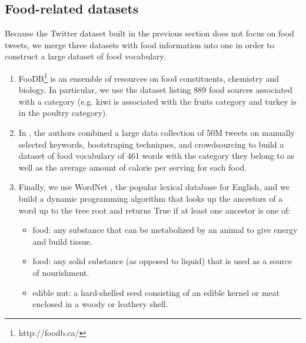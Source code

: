 \documentclass[letterpaper]{article}
\newcommand{\cut}[1]{}
\begin{document}
\subsection{Food-related datasets}

Because the Twitter dataset built in the previous section does not focus on food tweets, we merge three datasets with food information into one in order to construct a large dataset of food vocabulary.

\begin{enumerate}

  \item FooDB\footnote{http://foodb.ca/} is an ensemble of resources on food
  constituents, chemistry and biology. In particular, we use the dataset listing
  889 food sources associated with a category (e.g. kiwi is associated with the
  fruits category and turkey is in the poultry category).

  \item In \cite{abbar2015you}, the authors combined a large data collection of
  50M tweets on manually selected keywords, bootstraping techniques, and
  crowdsourcing to build a dataset of food vocabulary of 461 words with the
  category they belong to as well as the average amount of calorie per serving
  for each food.

  \item Finally, we use WordNet \cite{miller1995wordnet}, the popular lexical
  database for English, and we build a dynamic programming algorithm that looks
  up the ancestors of a word up to the tree root and returns True if at least one ancestor is one of:
  \begin{itemize}

    \item food: any substance that can be metabolized by an animal to give
    energy and build tissue.
    
    \item food: any solid substance (as opposed to liquid) that is used as a
    source of nourishment.

    \item edible nut: a hard-shelled seed consisting of an edible kernel or meat
    enclosed in a woody or leathery shell.

  \end{itemize}

\end{enumerate}

\cut{
  - foodb: http://foodb.ca/
  - wordnet: miller1995wordnet
  - you tweet what you eat
}
\end{document}

